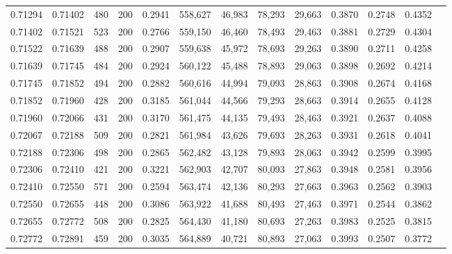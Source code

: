 \begin{tabular}{rrrrrrrrrrrrr}
0.71294 & 0.71402 &   480 & 200 &                                     0.2941 & 558,627 &  46,983 &  78,293 &  29,663 & 0.3870 & 0.2748 & 0.4352 \\
0.71402 & 0.71521 &   523 & 200 &                                     0.2766 & 559,150 &  46,460 &  78,493 &  29,463 & 0.3881 & 0.2729 & 0.4304 \\
0.71522 & 0.71639 &   488 & 200 &                                     0.2907 & 559,638 &  45,972 &  78,693 &  29,263 & 0.3890 & 0.2711 & 0.4258 \\
0.71639 & 0.71745 &   484 & 200 &                                     0.2924 & 560,122 &  45,488 &  78,893 &  29,063 & 0.3898 & 0.2692 & 0.4214 \\
0.71745 & 0.71852 &   494 & 200 &                                     0.2882 & 560,616 &  44,994 &  79,093 &  28,863 & 0.3908 & 0.2674 & 0.4168 \\
0.71852 & 0.71960 &   428 & 200 &                                     0.3185 & 561,044 &  44,566 &  79,293 &  28,663 & 0.3914 & 0.2655 & 0.4128 \\
0.71960 & 0.72066 &   431 & 200 &                                     0.3170 & 561,475 &  44,135 &  79,493 &  28,463 & 0.3921 & 0.2637 & 0.4088 \\
0.72067 & 0.72188 &   509 & 200 &                                     0.2821 & 561,984 &  43,626 &  79,693 &  28,263 & 0.3931 & 0.2618 & 0.4041 \\
0.72188 & 0.72306 &   498 & 200 &                                     0.2865 & 562,482 &  43,128 &  79,893 &  28,063 & 0.3942 & 0.2599 & 0.3995 \\
0.72306 & 0.72410 &   421 & 200 &                                     0.3221 & 562,903 &  42,707 &  80,093 &  27,863 & 0.3948 & 0.2581 & 0.3956 \\
0.72410 & 0.72550 &   571 & 200 &                                     0.2594 & 563,474 &  42,136 &  80,293 &  27,663 & 0.3963 & 0.2562 & 0.3903 \\
0.72550 & 0.72655 &   448 & 200 &                                     0.3086 & 563,922 &  41,688 &  80,493 &  27,463 & 0.3971 & 0.2544 & 0.3862 \\
0.72655 & 0.72772 &   508 & 200 &                                     0.2825 & 564,430 &  41,180 &  80,693 &  27,263 & 0.3983 & 0.2525 & 0.3815 \\
0.72772 & 0.72891 &   459 & 200 &                                     0.3035 & 564,889 &  40,721 &  80,893 &  27,063 & 0.3993 & 0.2507 & 0.3772 \\

\end{tabular}
